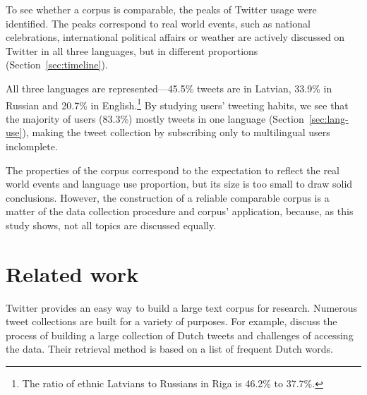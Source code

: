 \documentclass[11pt,a4paper]{article}
\begin{document}

To see whether a corpus is comparable, the peaks of Twitter usage were identified. The peaks correspond to real world events, such as national celebrations, international political affairs or weather are actively discussed on Twitter in all three languages, but in different proportions (Section~\ref{sec:timeline}).

All three languages are represented---45.5\% tweets are in Latvian, 33.9\% in Russian and 20.7\% in English.\footnote{
The ratio of ethnic Latvians to Russians in Riga is 46.2\% to 37.7\%.}
By studying users' tweeting habits, we see that the majority of users (83.3\%) mostly tweets in one language (Section~\ref{sec:lang-use}), making the tweet collection by subscribing only to multilingual users inclomplete.

The properties of the corpus correspond to the expectation to reflect the real world events and language use proportion, but its size is too small to draw solid conclusions. However, the construction of a reliable comparable corpus is a matter of the data collection procedure and corpus' application, because, as this study shows, not all topics are discussed equally.


\section{Related work}

Twitter %
provides an easy way to build a large text corpus for research. Numerous tweet collections are built for a variety of purposes. For example, \citet{sang2013} discuss the process of building a large collection of Dutch tweets and challenges of accessing the data. %
Their retrieval method is based on a list of frequent Dutch words.
\end{document}
